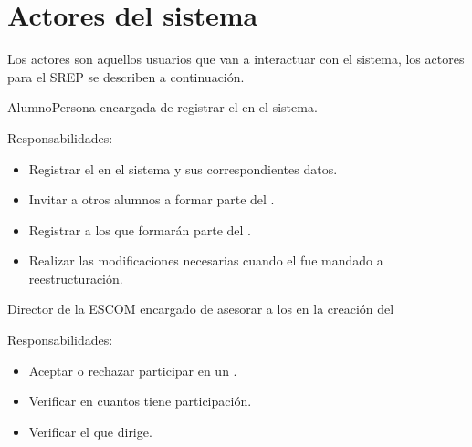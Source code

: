 \section{Actores del sistema}\label{sec:Comportamiento:ActoresSistema}

Los actores son aquellos usuarios que van a interactuar con el sistema, los actores para el SREP se describen a continuación.

\begin{actor}{Alumno}{Persona encargada de registrar el  en el sistema.} 
	\item[Responsabilidades:] \hspace{1pt}
	\begin{itemize}
		\item Registrar el  en el sistema y sus correspondientes datos.
		\item Invitar a otros alumnos a formar parte del .
		\item Registrar a los  que formarán parte del .
		\item Realizar las modificaciones necesarias cuando el  fue mandado a reestructuración.
	\end{itemize}
\end{actor}


\begin{actor}{Director}{ de la ESCOM encargado de asesorar a los  en la creación del } 
	\item[Responsabilidades:] \hspace{1pt}
	\begin{itemize}
		\item Aceptar o rechazar participar en un .
		\item Verificar en cuantos  tiene participación.
		\item Verificar el  que dirige.
	\end{itemize}
\end{actor}


